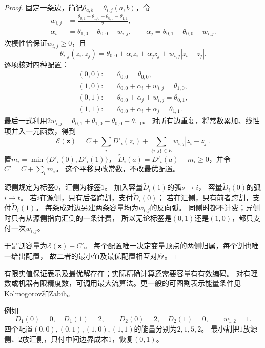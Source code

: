 \begin{proof}
固定一条边，简记\(\theta_{a,b}=\theta_{i,j}(a,b)\)，令
\begin{align}
  w_{i,j}
  &=\frac{\theta_{0,1}+\theta_{1,0}-\theta_{0,0}-\theta_{1,1}}2,
  \label{eq:graph-theory-cut-pair-weight}\\
  \alpha_i&=\theta_{1,0}-\theta_{0,0}-w_{i,j},\qquad
  \alpha_j=\theta_{0,1}-\theta_{0,0}-w_{i,j}.
  \label{eq:graph-theory-cut-unary-shifts}
\end{align}
次模性恰保证\(w_{i,j}\geq0\)，且
\begin{equation}
  \theta_{i,j}(z_i,z_j)=\theta_{0,0}+\alpha_i z_i+\alpha_j z_j
  +w_{i,j}|z_i-z_j|.
  \label{eq:graph-theory-pairwise-cut-decomposition}
\end{equation}
逐项核对四种配置：
\begin{align*}
  (0,0):\quad&\theta_{0,0}=\theta_{0,0},\\
  (1,0):\quad&\theta_{0,0}+\alpha_i+w_{i,j}=\theta_{1,0},\\
  (0,1):\quad&\theta_{0,0}+\alpha_j+w_{i,j}=\theta_{0,1},\\
  (1,1):\quad&\theta_{0,0}+\alpha_i+\alpha_j=\theta_{1,1}.
\end{align*}
最后一式利用\(2w_{i,j}=\theta_{0,1}+\theta_{1,0}-\theta_{0,0}-\theta_{1,1}\)。
对所有边重复，将常数累加、线性项并入一元函数，得到
\[
  \mathcal E(\bm z)=C+\sum_iD'_i(z_i)
    +\sum_{\{i,j\}\in E}w_{i,j}|z_i-z_j|.
\]
置\(m_i=\min\{D'_i(0),D'_i(1)\}\)，
\(\widetilde D_i(a)=D'_i(a)-m_i\geq0\)，并令\(C'=C+\sum_i m_i\)。
这个平移只改常数，不改最优配置。

源侧规定为标签\(0\)，汇侧为标签\(1\)。
加入容量\(\widetilde D_i(1)\)的弧\(s\to i\)，
容量\(\widetilde D_i(0)\)的弧\(i\to t\)。
若\(i\)在源侧，只有后者跨割，支付\(\widetilde D_i(0)\)；
若在汇侧，只有前者跨割，支付\(\widetilde D_i(1)\)。
每条成对边另建两条容量均为\(w_{i,j}\)的反向弧。
同侧时都不计费；异侧时只有从源侧指向汇侧的一条计费，
所以无论标签是\((0,1)\)还是\((1,0)\)，都只支付一次\(w_{i,j}\)。

于是割容量为\(\mathcal E(\bm z)-C'\)。
每个配置唯一决定变量顶点的两侧归属，每个割也唯一给出配置，
故二者的最小值及最优配置相互对应。
\end{proof}

有限实值保证表示及最优解存在；实际精确计算还需要容量有有效编码。
对有理数或机器有限精度数，可调用最大流算法。更一般的可图割表示能量条件见
Kolmogorov和Zabih。

例如
\[
  D_1(0)=0,\quad D_1(1)=2,\qquad
  D_2(0)=2,\quad D_2(1)=0,\qquad w_{1,2}=1.
\]
四个配置\((0,0),(0,1),(1,0),(1,1)\)的能量分别为\(2,1,5,2\)。
最小割把\(1\)放源侧、\(2\)放汇侧，只付中间边界成本\(1\)，恢复\((0,1)\)。

